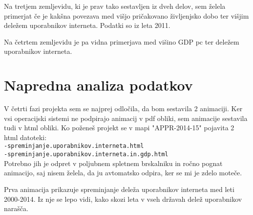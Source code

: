 \documentclass[11pt,a4paper]{article}
\begin{document}
\newpage

Na tretjem zemljevidu, ki je prav tako sestavljen iz dveh delov, sem  želela primerjat če je kakšna povezava med višjo pričakovano življenjsko dobo ter višjim deležem uporabnikov interneta. Podatki so iz leta 2011. \\

\begin{figure}[h!]
\begin{center}
  
  \end{center}
\end{figure}

\newpage
Na četrtem zemljevidu je pa vidna primerjava med višino GDP pc ter deležem uporabnikov interneta.

\begin{figure}[h!]
\begin{center}
  
  \end{center}
\end{figure}

\newpage
\section{Napredna analiza podatkov}
V četrti fazi projekta sem se najprej odločila, da bom sestavila 2 animaciji. Ker vsi operacijski sistemi ne podpirajo animacij v pdf obliki, sem animacije sestavila tudi v html obliki. Ko poženeš projekt se v mapi "APPR-2014-15" pojavita 2 html datoteki:
\\
\verb|-spreminjanje.uporabnikov.interneta.html|
\\
\verb|-spreminjanje.uporabnikov.interneta.in.gdp.html|
\\
Potrebno jih je odpret v poljubnem spletnem brskalniku in ročno pognat animacijo, saj nisem želela, da ju avtomatsko odpira, ker se mi je zdelo moteče.
\newpage

Prva animacija prikazuje spreminjanje deleža uporabnikov interneta med leti 2000-2014. Iz nje se lepo vidi, kako skozi leta v vseh državah delež uporabnikov narašča.
\begin{center}
\begin{figure}
\end{figure}

\end{center}
\end{document}

